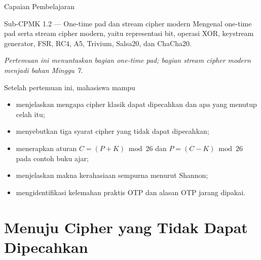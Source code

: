 \documentclass[aspectratio=169,11pt]{beamer}
\begin{document}
\begin{frame}{Capaian Pembelajaran}
    \begin{block}{Sub-CPMK 1.2 --- One-time pad dan stream cipher modern}
        \footnotesize
        Mengenal one-time pad serta stream cipher modern, yaitu representasi
        bit, operasi XOR, keystream generator, FSR, RC4, A5, Trivium,
        Salsa20, dan ChaCha20.
    \end{block}
    \vspace{0.1cm}
    {\scriptsize\itshape Pertemuan ini menuntaskan bagian one-time pad;
    bagian stream cipher modern menjadi bahan Minggu 7.}
    \vspace{0.15cm}
    \begin{exampleblock}{Setelah pertemuan ini, mahasiswa mampu}
        \footnotesize
        \begin{itemize}
            \item menjelaskan mengapa cipher klasik dapat dipecahkan dan
                  apa yang menutup celah itu;
            \item menyebutkan tiga syarat cipher yang tidak dapat
                  dipecahkan;
            \item menerapkan aturan $C=(P+K)\bmod 26$ dan
                  $P=(C-K)\bmod 26$ pada contoh buku ajar;
            \item menjelaskan makna kerahasiaan sempurna menurut Shannon;
            \item mengidentifikasi kelemahan praktis OTP dan alasan OTP
                  jarang dipakai.
        \end{itemize}
    \end{exampleblock}
\end{frame}

\section{Menuju Cipher yang Tidak Dapat Dipecahkan}
\end{document}
